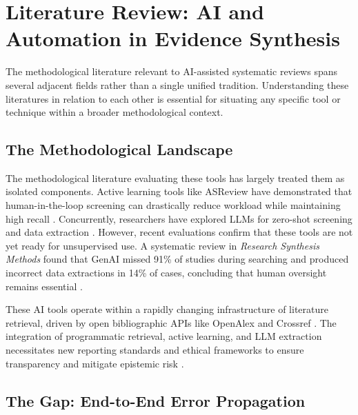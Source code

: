 \documentclass[12pt]{article}
\begin{document}
\section{Literature Review: AI and Automation in Evidence Synthesis}

The methodological literature relevant to AI-assisted systematic reviews spans several adjacent fields rather than a single unified tradition. Understanding these literatures in relation to each other is essential for situating any specific tool or technique within a broader methodological context.

\subsection{The Methodological Landscape}

The methodological literature evaluating these tools has largely treated them as isolated components. Active learning tools like ASReview have demonstrated that human-in-the-loop screening can drastically reduce workload while maintaining high recall \citep{vandeschoot2021asreview, teijema2023}. Concurrently, researchers have explored LLMs for zero-shot screening and data extraction \citep{qiao2024, mahmoudi2025, kim2025}. However, recent evaluations confirm that these tools are not yet ready for unsupervised use. A systematic review in \textit{Research Synthesis Methods} found that GenAI missed 91\% of studies during searching and produced incorrect data extractions in 14\% of cases, concluding that human oversight remains essential \citep{clark2025, lieberum2025}. 

These AI tools operate within a rapidly changing infrastructure of literature retrieval, driven by open bibliographic APIs like OpenAlex and Crossref \citep{priem2022openalex, delgado2024, culbert2025}. The integration of programmatic retrieval, active learning, and LLM extraction necessitates new reporting standards and ethical frameworks to ensure transparency and mitigate epistemic risk \citep{page2021prisma, rethlefsen2021prismas, chong2025smart, flemyng2025ai, mittelstadt2019ethics, harris2023epistemic, bender2021stochastic, markham2012ethical}.

\subsection{The Gap: End-to-End Error Propagation}
\end{document}
